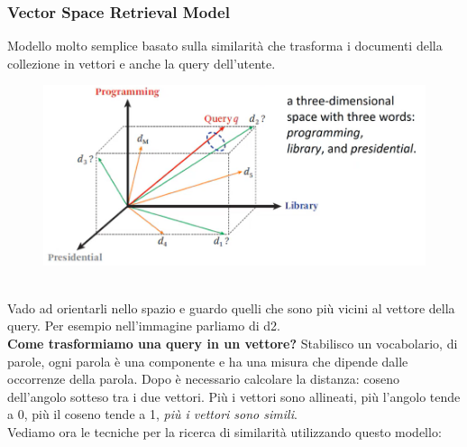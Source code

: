 \subsubsection{Vector Space Retrieval Model}
Modello molto semplice basato sulla similarità che trasforma i documenti della collezione in vettori e anche la query dell'utente. 
\\
\begin{figure}[th]
    \centering
    \includegraphics[scale=0.5]{Text Analysis/img/vector space retrieval.png}
\end{figure}
\\
Vado ad orientarli nello spazio e guardo quelli che sono più vicini al vettore della query. Per esempio nell'immagine parliamo di d2. 
\\
\textbf{Come trasformiamo una query in un vettore?} Stabilisco un vocabolario, di parole, ogni parola è una componente e ha una misura che dipende dalle occorrenze della parola. Dopo è necessario calcolare la distanza: coseno dell'angolo sotteso tra i due vettori. Più i vettori sono allineati, più l'angolo tende a 0, più il coseno tende a 1, \textit{più i vettori sono simili}. 
\\
Vediamo ora le tecniche per la ricerca di similarità utilizzando questo modello:
